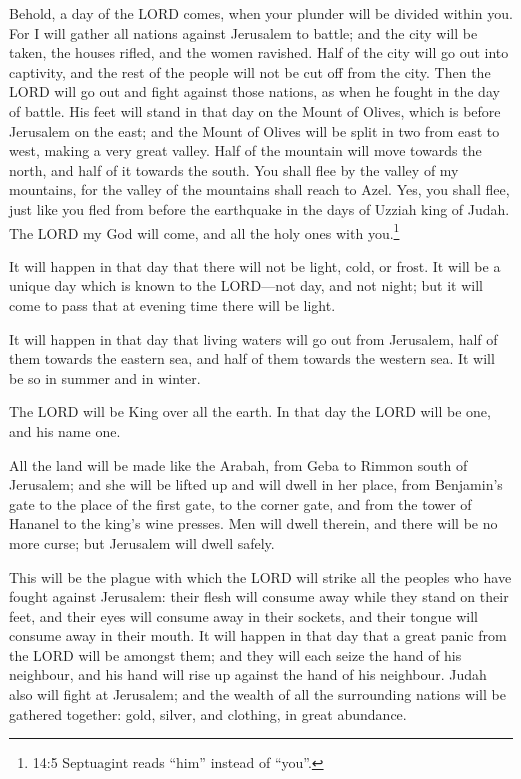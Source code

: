  Behold, a day of the LORD comes, when your plunder will be
divided within you.  For I will gather all nations against
Jerusalem to battle; and the city will be taken, the houses rifled, and
the women ravished. Half of the city will go out into captivity, and the
rest of the people will not be cut off from the city.  Then
the LORD will go out and fight against those nations, as when he fought
in the day of battle.  His feet will stand in that day on
the Mount of Olives, which is before Jerusalem on the east; and the
Mount of Olives will be split in two from east to west, making a very
great valley. Half of the mountain will move towards the north, and half
of it towards the south.  You shall flee by the valley of my
mountains, for the valley of the mountains shall reach to Azel. Yes, you
shall flee, just like you fled from before the earthquake in the days of
Uzziah king of Judah. The LORD my God will come, and all the holy ones
with you.\footnote{14:5 Septuagint reads ``him'' instead of ``you''.}

 It will happen in that day that there will not be light,
cold, or frost.  It will be a unique day which is known to
the LORD---not day, and not night; but it will come to pass that at
evening time there will be light.

 It will happen in that day that living waters will go out
from Jerusalem, half of them towards the eastern sea, and half of them
towards the western sea. It will be so in summer and in winter.

 The LORD will be King over all the earth. In that day the
LORD will be one, and his name one.

 All the land will be made like the Arabah, from Geba to
Rimmon south of Jerusalem; and she will be lifted up and will dwell in
her place, from Benjamin's gate to the place of the first gate, to the
corner gate, and from the tower of Hananel to the king's wine presses.
 Men will dwell therein, and there will be no more curse;
but Jerusalem will dwell safely.

 This will be the plague with which the LORD will strike
all the peoples who have fought against Jerusalem: their flesh will
consume away while they stand on their feet, and their eyes will consume
away in their sockets, and their tongue will consume away in their
mouth.  It will happen in that day that a great panic from
the LORD will be amongst them; and they will each seize the hand of his
neighbour, and his hand will rise up against the hand of his neighbour.
 Judah also will fight at Jerusalem; and the wealth of all
the surrounding nations will be gathered together: gold, silver, and
clothing, in great abundance.


